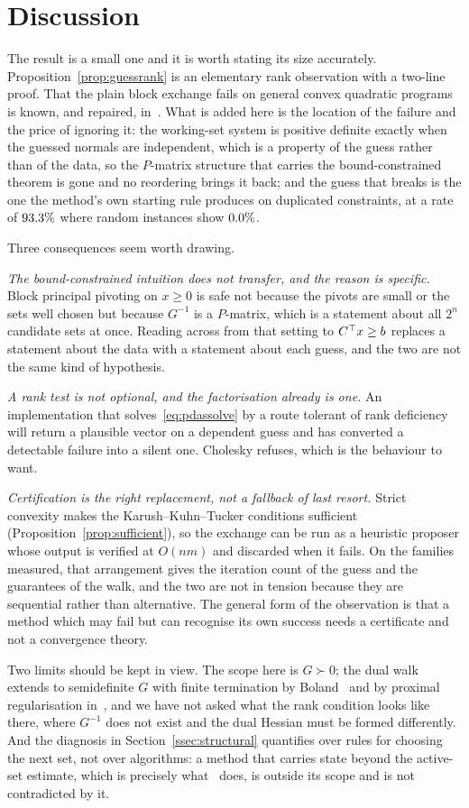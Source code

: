 \section{Discussion}
\label{sec:discussion}

The result is a small one and it is worth stating its size accurately.
Proposition~\ref{prop:guessrank} is an elementary rank observation with a two-line
proof. That the plain block exchange fails on general convex quadratic programs is
known, and repaired, in~\cite{curtis2015pdas}. What is added here is the location
of the failure and the price of ignoring it: the working-set system is positive
definite exactly when the guessed normals are independent, which is a property of
the guess rather than of the data, so the $P$-matrix structure that carries the
bound-constrained theorem is gone and no reordering brings it back; and the guess
that breaks is the one the method's own starting rule produces on duplicated
constraints, at a rate of $93.3\%$ where random instances show
$0.0\%$.

Three consequences seem worth drawing.

\emph{The bound-constrained intuition does not transfer, and the reason is
specific.} Block principal pivoting on $x \ge 0$ is safe not because the pivots
are small or the sets well chosen but because $G^{-1}$ is a $P$-matrix, which is a
statement about all $2^n$ candidate sets at once. Reading across from that setting
to $C^{\top} x \ge b$ replaces a statement about the data with a statement about each
guess, and the two are not the same kind of hypothesis.

\emph{A rank test is not optional, and the factorisation already is one.} An
implementation that solves~\eqref{eq:pdassolve} by a route tolerant of rank
deficiency will return a plausible vector on a dependent guess and has converted a
detectable failure into a silent one. Cholesky refuses, which is the behaviour to
want.

\emph{Certification is the right replacement, not a fallback of last resort.}
Strict convexity makes the Karush--Kuhn--Tucker conditions sufficient
(Proposition~\ref{prop:sufficient}), so the exchange can be run as a heuristic
proposer whose output is verified at $O(nm)$ and discarded when it fails. On the
families measured, that arrangement gives the iteration count of the guess and the
guarantees of the walk, and the two are not in tension because they are sequential
rather than alternative. The general form of the observation is that a
method which may fail but can recognise its own success needs a certificate and
not a convergence theory.

Two limits should be kept in view. The scope here is $G \succ 0$; the dual walk
extends to semidefinite $G$ with finite termination by Boland~\cite{boland1997}
and by proximal regularisation in~\cite{arnstrom2022daqp}, and we have not asked
what the rank condition looks like there, where $G^{-1}$ does not exist and the
dual Hessian must be formed differently. And the diagnosis in
Section~\ref{ssec:structural} quantifies over rules for choosing the next set, not
over algorithms: a method that carries state beyond the active-set estimate, which
is precisely what~\cite{curtis2015pdas} does, is outside its scope and is not
contradicted by it.
